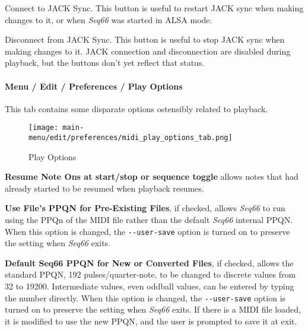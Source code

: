   Connect to JACK Sync.
   This button is useful to restart JACK sync when making changes to it,
   or when \textsl{Seq66} was started in ALSA mode.

   Disconnect from JACK Sync.
   This button is useful to stop JACK sync when making changes to it.
   JACK connection and disconnection are disabled during playback, but the
   buttons don't yet reflect that status.

\paragraph{Menu / Edit / Preferences / Play Options}
\label{paragraph:menu_edit_preferences_play_options}

   This tab contains some disparate options ostensibly related to playback.

\begin{figure}[H]
   \centering 
   \texttt{[image: main-menu/edit/preferences/midi\_play\_options\_tab.png]}
   \caption{Play Options}
   \label{fig:midi_play_options_tab}
\end{figure}

   \setcounter{ItemCounter}{0}      %

   \textbf{Resume Note Ons at start/stop or sequence toggle}
   allows notes that had already started
   to be resumed when playback resumes.

   \textbf{Use File's PPQN for Pre-Existing Files}, if checked, allows
   \textsl{Seq66} to run using the PPQn of the MIDI file rather than
   the default \textsl{Seq66} internal PPQN.
   When this option is changed, the \texttt{-{}-user-save} option is turned on
   to preserve the setting when \textsl{Seq66} exits.

   \textbf{Default Seq66 PPQN for New or Converted Files}, if checked, allows
   the standard PPQN, 192 pulses/quarter-note, to be changed to discrete values
   from 32 to 19200.  Intermediate values, even oddball values, can be entered
   by typing the number directly.
   When this option is changed, the \texttt{-{}-user-save} option is turned on
   to preserve the setting when \textsl{Seq66} exits.
   If there is a MIDI file loaded, it is modified to use the new PPQN, and the
   user is prompted to save it at exit.


